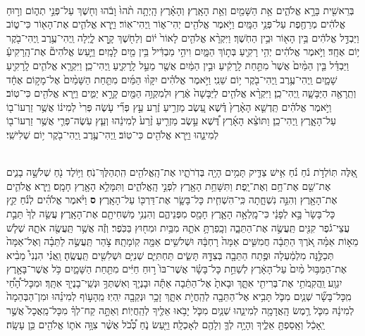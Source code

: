 \documentclass[twoside, openany, parskip=half, 11pt]{book}
\begin{document}
\begin{footnotesize}

\begin{multicols}{2}
\\
 בְּרֵאשִׁ֖ית בָּרָ֣א אֱלֹהִ֑ים אֵ֥ת הַשָּׁמַ֖יִם וְאֵ֥ת הָאָֽרֶץ׃ וְהָאָ֗רֶץ הָֽיְתָ֥ה תֹ֨הוּ֙ וָבֹ֔הוּ וְח֖שֶׁךְ עַל־פְּנֵ֣י תְה֑וֹם וְר֣וּחַ אֱלֹהִ֔ים מְרַחֶ֖פֶת עַל־פְּנֵ֥י הַמָּֽיִם׃ וַיֹּ֥אמֶר אֱלֹהִ֖ים יְהִי־א֑וֹר וַֽיְהִי־אֽוֹר׃ וַיַּ֧רְא אֱלֹהִ֛ים אֶת־הָא֖וֹר כִּי־ט֑וֹב וַיַּבְדֵּ֣ל אֱלֹהִ֔ים בֵּ֥ין הָא֖וֹר וּבֵ֥ין הַחֹֽשֶׁךְ׃ וַיִּקְרָ֨א אֱלֹהִ֤ים לָאוֹר֙ י֔וֹם וְלַחֹ֖שֶׁךְ קָ֣רָא לָ֑יְלָה וַֽיְהִי־עֶ֥רֶב וַֽיְהִי־בֹ֖קֶר י֥וֹם אֶחָֽד׃ 
 וַיֹּ֣אמֶר אֱלֹהִ֔ים יְהִ֥י רָקִ֖יעַ בְּת֣וֹךְ הַמָּ֑יִם וִיהִ֣י מַבְדִּ֔יל בֵּ֥ין מַ֖יִם לָמָֽיִם׃ וַיַּ֣עַשׂ אֱלֹהִים֘ אֶת־הָֽרָקִיעַ֒ וַיַּבְדֵּ֗ל בֵּ֤ין הַמַּ֨יִם֙ אֲשֶׁר֙ מִתַּ֣חַת לָֽרָקִ֔יעַ וּבֵ֣ין הַמַּ֔יִם אֲשֶׁ֖ר מֵעַ֣ל לָֽרָקִ֑יעַ וַֽיְהִי־כֵֽן׃ וַיִּקְרָ֧א אֱלֹהִ֛ים לָֽרָקִ֖יעַ שָׁמָ֑יִם וַֽיְהִי־עֶ֥רֶב וַֽיְהִי־בֹ֖קֶר י֥וֹם שֵׁנִֽי׃ 
וַיֹּ֣אמֶר אֱלֹהִ֗ים יִקָּו֨וּ הַמַּ֜יִם מִתַּ֤חַת הַשָּׁמַ֨יִם֙ אֶל־מָק֣וֹם אֶחָ֔ד וְתֵֽרָאֶ֖ה הַיַּבָּשָׁ֑ה וַֽיְהִי־כֵֽן׃ וַיִּקְרָ֨א אֱלֹהִ֤ים לַיַּבָּשָׁה֙ אֶ֔רֶץ וּלְמִקְוֵ֥ה הַמַּ֖יִם קָרָ֣א יַמִּ֑ים וַיַּ֥רְא אֱלֹהִ֖ים כִּי־טֽוֹב׃ וַיֹּ֣אמֶר אֱלֹהִ֗ים תַּֽדְשֵׁ֤א הָאָ֨רֶץ֙ דֶּ֗שֶׁא עֵ֚שֶׂב מַזְרִ֣יעַ זֶ֔רַע עֵ֣ץ פְּרִ֞י עֹ֤שֶׂה פְּרִי֙ לְמִינ֔וֹ אֲשֶׁ֥ר זַרְעוֹ־ב֖וֹ עַל־הָאָ֑רֶץ וַֽיְהִי־כֵֽן׃ וַתּוֹצֵ֨א הָאָ֜רֶץ דֶּ֠שֶׁא עֵ֣שֶׂב מַזְרִ֤יעַ זֶ֨רַע֙ לְמִינֵ֔הוּ וְעֵ֧ץ עֹֽשֶׂה־פְּרִ֛י אֲשֶׁ֥ר זַרְעוֹ־ב֖וֹ לְמִינֵ֑הוּ וַיַּ֥רְא אֱלֹהִ֖ים כִּי־טֽוֹב׃ וַֽיְהִי־עֶ֥רֶב וַֽיְהִי־בֹ֖קֶר י֥וֹם שְׁלִישִֽׁי׃

\\
 אֵ֚לֶּה תּֽוֹלְדֹ֣ת נֹ֔חַ נֹ֗חַ אִ֥ישׁ צַדִּ֛יק תָּמִ֥ים הָיָ֖ה בְּדֹֽרֹתָ֑יו אֶת־הָֽאֱלֹהִ֖ים הִֽתְהַלֶּךְ־נֹֽחַ׃ וַיּ֥וֹלֶד נֹ֖חַ שְׁלֹשָׁ֣ה בָנִ֑ים אֶת־שֵׁ֖ם אֶת־חָ֥ם וְאֶת־יָֽפֶת׃ וַתִּשָּׁחֵ֥ת הָאָ֖רֶץ לִפְנֵ֣י הָֽאֱלֹהִ֑ים וַתִּמָּלֵ֥א הָאָ֖רֶץ חָמָֽס׃ וַיַּ֧רְא אֱלֹהִ֛ים אֶת־הָאָ֖רֶץ וְהִנֵּ֣ה נִשְׁחָ֑תָה כִּֽי־הִשְׁחִ֧ית כָּל־בָּשָׂ֛ר אֶת־דַּרְכּ֖וֹ עַל־הָאָֽרֶץ׃ \textbf{ס} וַיֹּ֨אמֶר אֱלֹהִ֜ים לְנֹ֗חַ קֵ֤ץ כָּל־בָּשָׂר֙ בָּ֣א לְפָנַ֔י כִּי־מָֽלְאָ֥ה הָאָ֛רֶץ חָמָ֖ס מִפְּנֵיהֶ֑ם וְהִנְנִ֥י מַשְׁחִיתָ֖ם אֶת־הָאָֽרֶץ׃ עֲשֵׂ֤ה לְךָ֙ תֵּבַ֣ת עֲצֵי־גֹ֔פֶר קִנִּ֖ים תַּֽעֲשֶׂ֣ה אֶת־הַתֵּבָ֑ה וְכָֽפַרְתָּ֥ אֹתָ֛הּ מִבַּ֥יִת וּמִח֖וּץ בַּכֹּֽפֶר׃ וְזֶ֕ה אֲשֶׁ֥ר תַּֽעֲשֶׂ֖ה אֹתָ֑הּ שְׁל֧שׁ מֵא֣וֹת אַמָּ֗ה אֹ֚רֶךְ הַתֵּבָ֔ה חֲמִשִּׁ֤ים אַמָּה֙ רָחְבָּ֔הּ וּשְׁלשִׁ֥ים אַמָּ֖ה קֽוֹמָתָֽהּ׃ צֹ֣הַר תַּֽעֲשֶׂ֣ה לַתֵּבָ֗ה וְאֶל־אַמָּה֙ תְּכַלֶּ֣נָּה מִלְמַ֔עְלָה וּפֶ֥תַח הַתֵּבָ֖ה בְּצִדָּ֣הּ תָּשִׂ֑ים תַּחְתִּיִּ֛ם שְׁנִיִּ֥ם וּשְׁלִשִׁ֖ים תַּֽעֲשֶֽׂהָ׃  וַֽאֲנִ֗י הִנְנִי֩ מֵבִ֨יא אֶת־הַמַּבּ֥וּל מַ֨יִם֙ עַל־הָאָ֔רֶץ לְשַׁחֵ֣ת כָּל־בָּשָׂ֗ר אֲשֶׁר־בּוֹ֙ ר֣וּחַ חַיִּ֔ים מִתַּ֖חַת הַשָּׁמָ֑יִם כֹּ֥ל אֲשֶׁר־בָּאָ֖רֶץ יִגְוָֽע׃ וַֽהֲקִֽמֹתִ֥י אֶת־בְּרִיתִ֖י אִתָּ֑ךְ וּבָאתָ֙ אֶל־הַתֵּ֔בָה אַתָּ֕ה וּבָנֶי֛ךָ וְאִשְׁתְּךָ֥ וּנְשֵֽׁי־בָנֶי֖ךָ אִתָּֽךְ׃ וּמִכָּל־הָ֠חַ֠י מִֽכָּל־בָּשָׂ֞ר שְׁנַ֧יִם מִכֹּ֛ל תָּבִ֥יא אֶל־הַתֵּבָ֖ה לְהַֽחֲיֹ֣ת אִתָּ֑ךְ זָכָ֥ר וּנְקֵבָ֖ה יִֽהְיֽוּ׃  מֵֽהָע֣וֹף לְמִינֵ֗הוּ וּמִן־הַבְּהֵמָה֙ לְמִינָ֔הּ מִכֹּ֛ל רֶ֥מֶשׂ הָֽאֲדָמָ֖ה לְמִינֵ֑הוּ שְׁנַ֧יִם מִכֹּ֛ל יָבֹ֥אוּ אֵלֶ֖יךָ לְהַֽחֲיֽוֹת׃ וְאַתָּ֣ה קַח־לְךָ֗ מִכָּל־מַֽאֲכָל֙ אֲשֶׁ֣ר יֵֽאָכֵ֔ל וְאָֽסַפְתָּ֖ אֵלֶ֑יךָ וְהָיָ֥ה לְךָ֛ וְלָהֶ֖ם לְאָכְלָֽה׃ וַיַּ֖עַשׂ נֹ֑חַ כְּ֠כֹ֠ל אֲשֶׁ֨ר צִוָּ֥ה אֹת֛וֹ אֱלֹהִ֖ים כֵּ֥ן עָשָֽׂה׃


\end{multicols}
\end{footnotesize}
\end{document}
